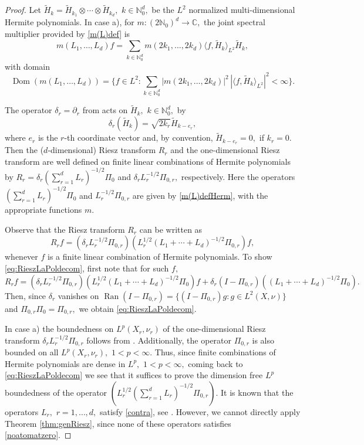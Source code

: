 \documentclass[leqno,12pt]{amsart}
\theoremstyle{definition}
\theoremstyle{remark}
\begin{document}
\begin{proof}
 Let ${\tilde{H}}_k={\tilde{H}}_{k_1}\otimes\cdots\otimes {\tilde{H}}_{k_d},$ $k\in \mathbb{N}_0^d,$ be the $L^2$ normalized multi-dimensional Hermite polynomials. In case a), for $m\colon(2\mathbb{N}_0)^d\to \mathbb{C},$ the joint spectral multiplier provided by \eqref{m(L)def} is
\begin{equation}
\label{m(L)defHerm}
m(L_1,\ldots,L_d)f=\sum_{k\in\mathbb{N}^d_0}m(2k_1,\ldots,2k_d)\langle f, {\tilde{H}}_k\rangle_{L^2} {\tilde{H}}_k,
\end{equation}
with domain
$$\operatorname{Dom}(m(L_1,\ldots,L_d))=\bigg\{f\in L^2\colon \sum_{k\in \mathbb{N}^d_0}|m(2k_1,\ldots,2k_d)|^2\,|\langle f, {\tilde{H}}_{k}\rangle_{L^2}|^2<\infty\bigg\}.$$

The operator $\delta_r=\partial_r$ from \cite[p. 689]{NSRiesz} acts on ${\tilde{H}}_k,$ $k\in\mathbb{N}^d_0,$ by $$\delta_r({\tilde{H}}_k)=\sqrt{2k_r}{\tilde{H}}_{k-e_r},$$
 where $e_r$ is the $r$-th coordinate vector and, by convention, ${\tilde{H}}_{k-e_r}=0,$ if $k_r=0.$ Then the ($d$-dimensional) Riesz transform $R_r$ and the one-dimensional Riesz transform are well defined on finite linear combinations of Hermite polynomials by $R_r=\delta_r (\sum_{r=1}^d L_r)^{-1/2}\Pi_{0}$ and $\delta_r L_r^{-1/2}\Pi_{0,r},$ respectively. Here the operators $(\sum_{r=1}^d L_r)^{-1/2}\Pi_{0}$ and $L_r^{-1/2}\Pi_{0,r}$ are given by \eqref{m(L)defHerm}, with the appropriate functions $m.$

Observe that the Riesz transform $R_r$ can be written as
\begin{equation}
\label{eq:RieszLaPoldecom}
R_r f=(\delta_rL_r^{-1/2}\Pi_{0,r})(L_r^{1/2}(L_1+\cdots+ L_d)^{-1/2}\Pi_{0,r})f,
\end{equation}
whenever $f$ is a finite linear combination of Hermite polynomials. To show \eqref{eq:RieszLaPoldecom}, first note that for such $f,$
\begin{equation*}
R_rf=(\delta_rL_r^{-1/2}\Pi_{0,r})(L_r^{1/2}(L_1+\cdots+ L_d)^{-1/2}\Pi_{0})f+\delta_r(I-\Pi_{0,r})((L_1+\cdots+ L_d)^{-1/2}\Pi_0).
\end{equation*}
Then, since $\delta_r$ vanishes on $\operatorname{Ran}(I-\Pi_{0,r})=\{(I-\Pi_{0,r})g\colon g\in L^2(X,\nu)\}$ and $\Pi_{0,r}\Pi_0=\Pi_{0,r},$ we obtain \eqref{eq:RieszLaPoldecom}.

In case a) the boundedness on $L^p(X_r,\nu_r)$ of the one-dimensional Riesz transform $\delta_rL_r^{-1/2}\Pi_{0,r}$ follows from \cite{Muck2}. Additionally, the operator $\Pi_{0,r}$ is also bounded on all $L^p(X_r,\nu_r),$ $1<p<\infty.$ Thus, since finite combinations of Hermite polynomials are dense in $L^p,$ $1<p<\infty,$ coming back to \eqref{eq:RieszLaPoldecom} we see that it suffices to prove the dimension free $L^p$ boundedness of the operator $(L_r^{1/2}(\sum_{r=1}^d L_r)^{-1/2}\Pi_{0,r}).$ It is known that the operators $L_r,$ $r=1,\ldots,d,$ satisfy \eqref{contra}, see \cite[Proposition 1.1. i)]{funccalOu}. However, we cannot directly apply Theorem \ref{thm:genRiesz}, since none of these operators satisfies \eqref{noatomatzero}.


\end{proof}
\end{document}
